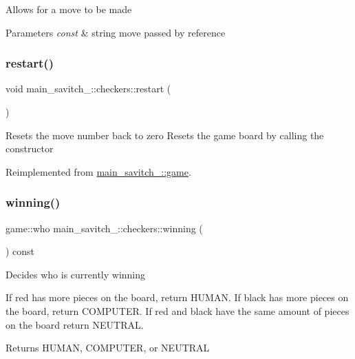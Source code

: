Allows for a move to be made 
\begin{DoxyParams}{Parameters}
{\em const} & string move passed by reference \\
\hline
\end{DoxyParams}
\mbox{\label{classmain__savitch__14_1_1checkers_ad3ee0adbdabda9136ecd46b958c83d24}} 
\subsubsection{\texorpdfstring{restart()}{restart()}}
{\footnotesize\ttfamily void main\+\_\+savitch\+\_\+::checkers\+::restart (\begin{DoxyParamCaption}{ }\end{DoxyParamCaption})\hspace{0.3cm}{\ttfamily [virtual]}}

Resets the move number back to zero Resets the game board by calling the constructor 

Reimplemented from \hyperlink{classmain__savitch__14_1_1game_ad521a7d78e7c163a0bc28b709f0d45fd}{main\+\_\+savitch\+\_\+::game}.

\mbox{\label{classmain__savitch__14_1_1checkers_aad9a08662e9fdf62752c60997b29370e}} 
\subsubsection{\texorpdfstring{winning()}{winning()}}
{\footnotesize\ttfamily game\+::who main\+\_\+savitch\+\_\+::checkers\+::winning (\begin{DoxyParamCaption}{ }\end{DoxyParamCaption}) const\hspace{0.3cm}{\ttfamily [virtual]}}

Decides who is currently winning

If red has more pieces on the board, return H\+U\+M\+AN. If black has more pieces on the board, return C\+O\+M\+P\+U\+T\+ER. If red and black have the same amount of pieces on the board return N\+E\+U\+T\+R\+AL. \begin{DoxyReturn}{Returns}
H\+U\+M\+AN, C\+O\+M\+P\+U\+T\+ER, or N\+E\+U\+T\+R\+AL 
\end{DoxyReturn}


